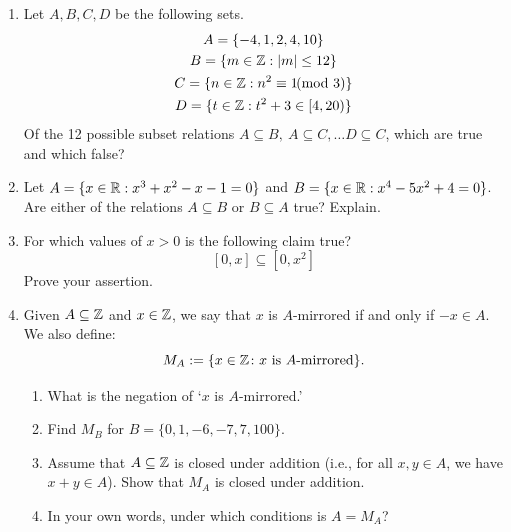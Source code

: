 % 

\begin{exercises}{}{}

\begin{enumerate}
  \item Let $A,B,C,D$ be the following sets.
  \begin{gather*}
  A=\{-4,1,2,4,10\}\\
  B=\{m\in\mathbb{Z}:\left| m\right|\le 12\}\\
  C=\{n\in\mathbb{Z}:n^2\equiv 1\negthickspace\negthickspace\pmod 3\}\\
  D=\{t\in\mathbb{Z}:t^2+3\in [4,20)\}  
  \end{gather*}
  Of the 12 possible subset relations $A\subseteq B,\ A\subseteq C,\ldots D\subseteq C$, which are true and which false?
  
  \item Let $A=\{x\in\mathbb{R}:x^3+x^2-x-1=0\}$ and $B=\{x\in\mathbb{R}:x^4-5x^2+4=0\}$. Are either of the relations $A\subseteq B$ or $B\subseteq A$ true? Explain.
  
  \item For which values of $x>0$ is the following claim true?
  \[[0,x]\subseteq[0,x^2]\]
  Prove your assertion.
  
  \item\label{ex:mirrored} Given $A\subseteq\mathbb{Z}$ and $x\in\mathbb{Z}$, we say that $x$ is $A$-mirrored if and only if $-x\in A$. We also define:
  \[M_A:=\{x\in\mathbb{Z}\colon x\text{ is $A$-mirrored}\}.\]
		\begin{enumerate}
	  	\item What is the negation of `$x$ is $A$-mirrored.'
	  	\item Find $M_B$ for $B=\{0,1,-6,-7,7,100\}$.
	  	\item Assume that $A \subseteq\mathbb{Z}$ is closed under addition (i.e., for all $x,y\in A$, we have $x+y\in A$). Show that $M_A$ is closed under addition.
	  	\item In your own words, under which conditions is $A=M_A$?
		\end{enumerate}


\end{enumerate}
\end{exercises}
